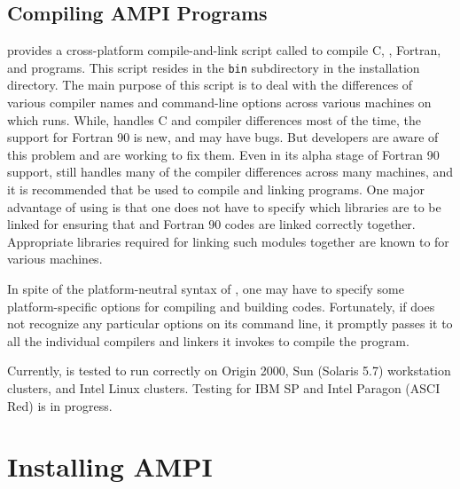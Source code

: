 \documentclass[10pt]{article}
\begin{document}
\subsection{Compiling AMPI Programs}

\charmpp{} provides a cross-platform compile-and-link script called \charmc{}
to compile C, \CC{}, Fortran, \charmpp{} and \ampi{} programs.  This script
resides in the \texttt{bin} subdirectory in the \charmpp{} installation
directory. The main purpose of this script is to deal with the differences of
various compiler names and command-line options across various machines on
which \charmpp{} runs. While, \charmc{} handles C and \CC{} compiler
differences most of the time, the support for Fortran 90 is new, and may have
bugs. But \charmpp{} developers are aware of this problem and are working to
fix them. Even in its alpha stage of Fortran 90 support, \charmc{} still
handles many of the compiler differences across many machines, and it is
recommended that \charmc{} be used to compile and linking \ampi{} programs. One
major advantage of using \charmc{} is that one does not have to specify which
libraries are to be linked for ensuring that \CC{} and Fortran 90 codes are
linked correctly together. Appropriate libraries required for linking such
modules together are known to \charmc{} for various machines.

In spite of the platform-neutral syntax of \charmc{}, one may have to specify
some platform-specific options for compiling and building \ampi{} codes.
Fortunately, if \charmc{} does not recognize any particular options on its
command line, it promptly passes it to all the individual compilers and linkers
it invokes to compile the program.

Currently, \ampi{} is tested to run correctly on Origin 2000, Sun (Solaris 5.7)
workstation clusters, and Intel Linux clusters. Testing for IBM SP and Intel
Paragon (ASCI Red) is in progress.

\appendix

\section{Installing AMPI}
\end{document}
